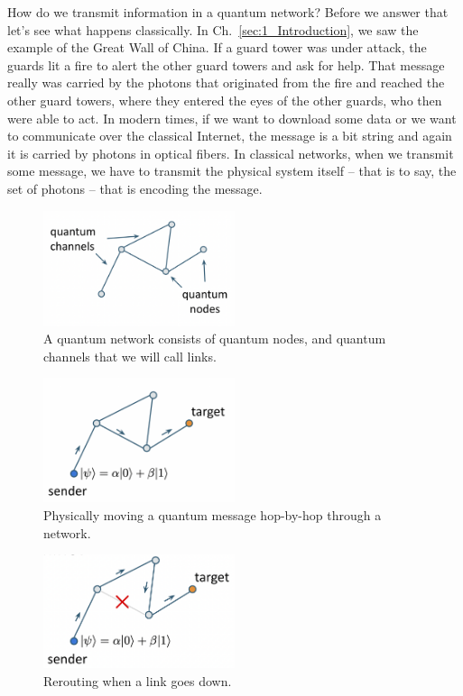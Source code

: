 How do we transmit information in a quantum network? Before we answer that let's see what happens classically. In Ch.~\ref{sec:1_Introduction}, we saw the example of the Great Wall of China. If a guard tower was under attack, the guards lit a fire to alert the other guard towers and ask for help. That message really was carried by the photons that originated from the fire and reached the other guard towers, where they entered the eyes of the other guards, who then were able to act. In modern times, if we want to download some data or we want to communicate over the classical Internet, the message is a bit string and again it is carried by photons in optical fibers. In classical networks, when we transmit some message, we have to transmit the physical system itself  -- that is to say, the set of photons -- that is encoding the message.
\begin{figure}[H]
    \centering
    \includegraphics[width=0.5\textwidth]{lesson8/quantum-network.png}
        \caption{A quantum network consists of quantum nodes, and quantum channels that we will call links.}
    \label{fig:quantum-network}
\end{figure}
\begin{figure}[H]
    \centering
    \includegraphics[width=0.5\textwidth]{lesson8/hop-by-hop.png}
        \caption{Physically moving a quantum message hop-by-hop through a network.}
    \label{fig:hop-by-hop}
\end{figure}
\begin{figure}[H]
    \centering
    \includegraphics[width=0.5\textwidth]{lesson8/link-down.png}
        \caption{Rerouting when a link goes down.}
    \label{fig:link-down}
\end{figure}
